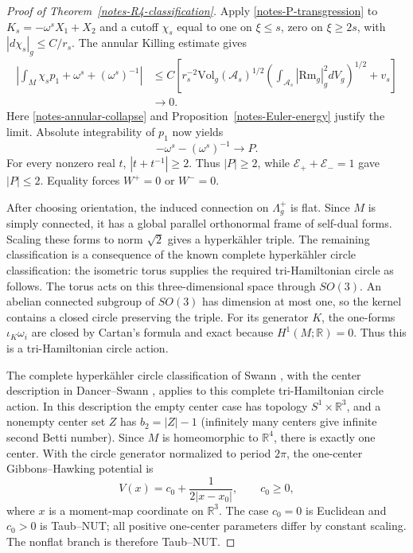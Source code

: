 \documentclass[letterpaper]{amsart}
\theoremstyle{definition}
\theoremstyle{remark}
\def\Vol{\mathrm{Vol}}
\def\Rm{\mathrm{Rm}}
\begin{document}
\begin{proof}[Proof of Theorem~\ref{notes-R4-classification}]
Apply \eqref{notes-P-transgression} to $K_s=-\omega^sX_1+X_2$ and a cutoff
$\chi_s$ equal to one on $\xi\le s$, zero on $\xi\ge2s$, with
$|d\chi_s|_g\le C/r_s$. The annular Killing estimate gives
\begin{align*}
 \left|\int_M\chi_s p_1+\omega^s+(\omega^s)^{-1}\right|
 &\le C\left[
 r_s^{-2}\Vol_g(\mathcal A_s)^{1/2}
       \left(\int_{\mathcal A_s}|\Rm_g|_g^2dV_g\right)^{1/2}
       +v_s\right]\\
 &\to 0.
\end{align*}
Here \eqref{notes-annular-collapse} and Proposition~\ref{notes-Euler-energy}
justify the limit. Absolute integrability of $p_1$ now yields
\[
 -\omega^s-(\omega^s)^{-1}\to  P.
\]
For every nonzero real $t$, $|t+t^{-1}|\ge2$. Thus $|P|\ge2$, while
$\mathcal E_++\mathcal E_-=1$ gave $|P|\le2$. Equality forces
$W^+=0$ or $W^-=0$.

After choosing orientation, the induced connection on $\Lambda_g^+$ is
flat. Since $M$ is simply connected, it has a global parallel orthonormal
frame of self-dual forms. Scaling these forms to norm $\sqrt2$ gives a
hyperk\"ahler triple. The remaining classification is a consequence of the
known complete hyperk\"ahler circle classification: the isometric torus
supplies the required tri-Hamiltonian circle as follows. The torus acts on
this three-dimensional space through $SO(3)$. An abelian connected subgroup
of $SO(3)$ has dimension at most one, so the kernel contains a closed circle
preserving the triple. For its generator $K$, the one-forms
$\iota_K\omega_i$ are closed by Cartan's formula and exact because
$H^1(M;\mathbb R)=0$. Thus this is a tri-Hamiltonian circle action.

The complete hyperk\"ahler circle classification of Swann
\cite[Theorem~3.1]{notes-Swann}, with the center description in
Dancer--Swann \cite[Section~2.2]{notes-DancerSwann}, applies to this complete tri-Hamiltonian circle action. In this description the empty
center case has topology $S^1\times\mathbb R^3$, and a nonempty center set
$Z$ has $b_2=|Z|-1$ (infinitely many centers give infinite second Betti
number). Since $M$ is homeomorphic to $\mathbb R^4$, there is exactly one
center. With the circle generator normalized to period $2\pi$, the
one-center Gibbons--Hawking potential is
\[
 V(x)=c_0+\frac1{2|x-x_0|},\qquad c_0\ge0,
\]
where $x$ is a moment-map coordinate on $\mathbb R^3$. The case $c_0=0$
is Euclidean and $c_0>0$ is Taub--NUT; all positive one-center parameters
differ by constant scaling.
The nonflat branch is therefore Taub--NUT.
\end{proof}
\end{document}
